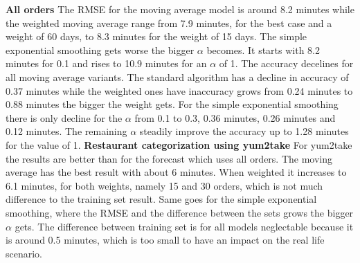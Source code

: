 \newline\newline\textbf{All orders}\newline
The RMSE for the moving average model is around 8.2 minutes while the weighted moving average range from 7.9 minutes, for the best case and a weight of 60 days, to 8.3 minutes for the weight of 15 days. The simple exponential smoothing gets worse the bigger $\alpha$ becomes. It starts with 8.2 minutes for 0.1 and rises to 10.9 minutes for an $\alpha$ of 1. The accuracy decelines for all moving average variants. The standard algorithm has a decline in accuracy of 0.37 minutes while the weighted ones have inaccuracy grows from 0.24 minutes to 0.88 minutes the bigger the weight gets. For the simple exponential smoothing there is only decline for the $\alpha$ from 0.1 to 0.3, 0.36 minutes, 0.26 minutes and 0.12 minutes. The remaining $\alpha$ steadily improve the accuracy up to 1.28 minutes for the value of 1.
\newline\newline\textbf{Restaurant categorization using yum2take}\newline
For yum2take the results are better than for the forecast which uses all orders. The moving average has the best result with about 6 minutes. When weighted it increases to 6.1 minutes, for both weights, namely 15 and 30 orders, which is not much difference to the training set result. Same goes for the simple exponential smoothing, where the RMSE and the difference between the sets grows the bigger $\alpha$ gets. The difference between training set is for all models neglectable because it is around 0.5 minutes, which is too small to have an impact on the real life scenario.
